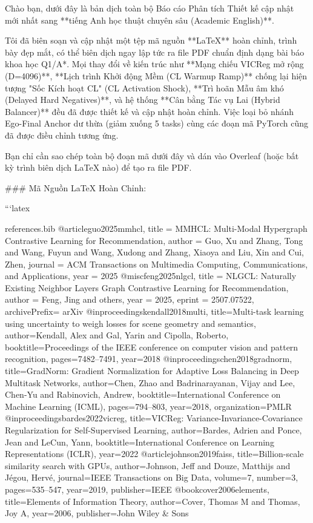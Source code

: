 Chào bạn, dưới đây là bản dịch toàn bộ Báo cáo Phân tích Thiết kế cập nhật mới nhất sang **tiếng Anh học thuật chuyên sâu (Academic English)**. 

Tôi đã biên soạn và cập nhật một tệp mã nguồn **LaTeX** hoàn chỉnh, trình bày đẹp mắt, có thể biên dịch ngay lập tức ra file PDF chuẩn định dạng bài báo khoa học Q1/A*. Mọi thay đổi về kiến trúc như **Mạng chiếu VICReg mở rộng (D=4096)**, **Lịch trình Khởi động Mềm (CL Warmup Ramp)** chống lại hiện tượng "Sốc Kích hoạt CL" (CL Activation Shock), **Trì hoãn Mẫu âm khó (Delayed Hard Negatives)**, và hệ thống **Cân bằng Tác vụ Lai (Hybrid Balancer)** đều đã được thiết kế và cập nhật hoàn chỉnh. Việc loại bỏ nhánh Ego-Final Anchor dư thừa (giảm xuống 5 tasks) cùng các đoạn mã PyTorch cũng đã được điều chỉnh tương ứng.

Bạn chỉ cần sao chép toàn bộ đoạn mã dưới đây và dán vào Overleaf (hoặc bất kỳ trình biên dịch LaTeX nào) để tạo ra file PDF.

### Mã Nguồn LaTeX Hoàn Chỉnh:

```latex
\begin{filecontents*}{references.bib}
@article{guo2025mmhcl,
  title   = {{MMHCL}: Multi-Modal Hypergraph Contrastive Learning for Recommendation},
  author  = {Guo, Xu and Zhang, Tong and Wang, Fuyun and Wang, Xudong and Zhang, Xiaoya and Liu, Xin and Cui, Zhen},
  journal = {ACM Transactions on Multimedia Computing, Communications, and Applications},
  year    = {2025}
}
@misc{feng2025nlgcl,
  title        = {{NLGCL}: Naturally Existing Neighbor Layers Graph Contrastive Learning for Recommendation},
  author       = {Feng, Jing and others},
  year         = {2025},
  eprint       = {2507.07522},
  archivePrefix= {arXiv}
}
@inproceedings{kendall2018multi,
  title={Multi-task learning using uncertainty to weigh losses for scene geometry and semantics},
  author={Kendall, Alex and Gal, Yarin and Cipolla, Roberto},
  booktitle={Proceedings of the IEEE conference on computer vision and pattern recognition},
  pages={7482--7491},
  year={2018}
}
@inproceedings{chen2018gradnorm,
  title={GradNorm: Gradient Normalization for Adaptive Loss Balancing in Deep Multitask Networks},
  author={Chen, Zhao and Badrinarayanan, Vijay and Lee, Chen-Yu and Rabinovich, Andrew},
  booktitle={International Conference on Machine Learning (ICML)},
  pages={794--803},
  year={2018},
  organization={PMLR}
}
@inproceedings{bardes2022vicreg,
  title={{VICReg}: Variance-Invariance-Covariance Regularization for Self-Supervised Learning},
  author={Bardes, Adrien and Ponce, Jean and LeCun, Yann},
  booktitle={International Conference on Learning Representations (ICLR)},
  year={2022}
}
@article{johnson2019faiss,
  title={Billion-scale similarity search with {GPUs}},
  author={Johnson, Jeff and Douze, Matthijs and J{\'e}gou, Herv{\'e}},
  journal={IEEE Transactions on Big Data},
  volume={7},
  number={3},
  pages={535--547},
  year={2019},
  publisher={IEEE}
}
@book{cover2006elements,
  title={Elements of Information Theory},
  author={Cover, Thomas M and Thomas, Joy A},
  year={2006},
  publisher={John Wiley \& Sons}
}
\end{filecontents*}

